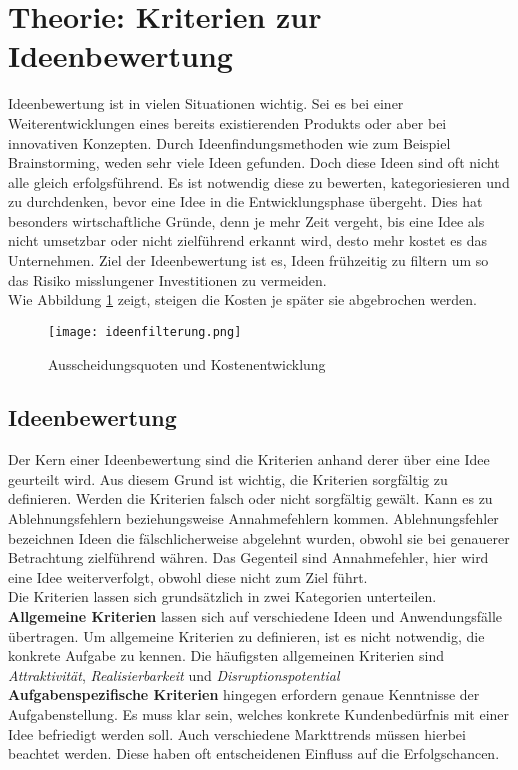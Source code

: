 \newpage
\section{Theorie: Kriterien zur Ideenbewertung}\label{sec:theorie}
Ideenbewertung ist in vielen Situationen wichtig. Sei es bei einer Weiterentwicklungen eines 
bereits existierenden Produkts oder aber bei innovativen Konzepten.
Durch Ideenfindungsmethoden wie zum Beispiel Brainstorming, weden sehr viele Ideen gefunden. Doch diese Ideen 
sind oft nicht alle gleich erfolgsführend. Es ist notwendig diese zu bewerten, kategoriesieren und zu durchdenken, bevor
eine Idee in die Entwicklungsphase übergeht. Dies hat besonders wirtschaftliche Gründe, denn je mehr 
Zeit vergeht, bis eine Idee als nicht umsetzbar oder nicht zielführend erkannt wird, desto mehr kostet es das Unternehmen.
Ziel der Ideenbewertung ist es, Ideen frühzeitig zu filtern um so das Risiko misslungener Investitionen zu vermeiden.
\cite{grossklaus:2008}\\
Wie Abbildung \ref{img:filterKosten} zeigt, steigen die Kosten je später sie abgebrochen werden.
\begin{figure}[h]
	\centering
	\texttt{[image: ideenfilterung.png]}
	\caption{Ausscheidungsquoten und Kostenentwicklung}
	\label{img:filterKosten}
\end{figure}


\subsection{Ideenbewertung}
Der Kern einer Ideenbewertung sind die Kriterien anhand derer über eine Idee geurteilt wird.
Aus diesem Grund ist wichtig, die Kriterien sorgfältig zu definieren. Werden die Kriterien falsch oder nicht sorgfältig gewält. 
Kann es zu Ablehnungsfehlern beziehungsweise Annahmefehlern kommen. 
Ablehnungsfehler bezeichnen Ideen die fälschlicherweise abgelehnt wurden, obwohl sie bei genauerer Betrachtung 
zielführend währen. Das Gegenteil sind Annahmefehler, hier wird eine Idee weiterverfolgt, obwohl diese nicht zum Ziel führt. \\
Die Kriterien lassen sich grundsätzlich in zwei Kategorien unterteilen.
\textbf{Allgemeine Kriterien} lassen sich auf verschiedene Ideen und Anwendungsfälle übertragen.
Um allgemeine Kriterien zu definieren, ist es nicht notwendig, die konkrete Aufgabe zu kennen. 
Die häufigsten allgemeinen Kriterien sind \textit{Attraktivität}, \textit{Realisierbarkeit} und 
\textit{Disruptionspotential}\\
\textbf{Aufgabenspezifische Kriterien} hingegen erfordern genaue Kenntnisse der Aufgabenstellung. Es muss klar sein, welches 
konkrete Kundenbedürfnis mit einer Idee befriedigt werden soll. Auch verschiedene Markttrends müssen hierbei beachtet werden. 
Diese haben oft entscheidenen Einfluss auf die Erfolgschancen. 

